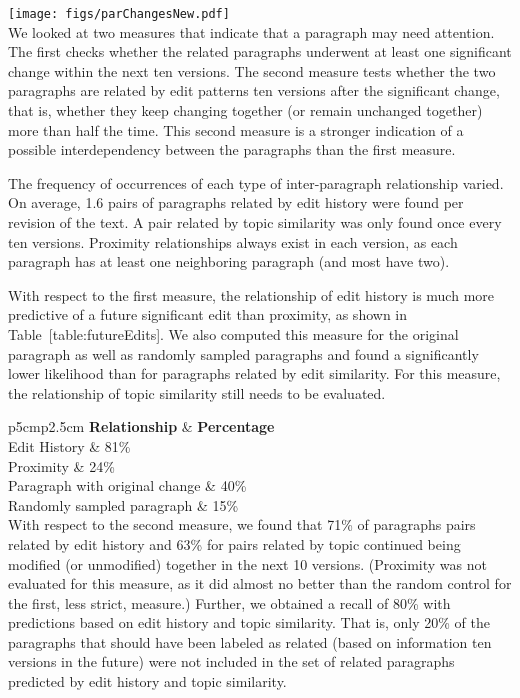 \texttt{[image: figs/parChangesNew.pdf]}\\

We looked at two measures that indicate that a paragraph may need
attention. The first checks whether the related paragraphs underwent at
least one significant change within the next ten versions. The second
measure tests whether the two paragraphs are related by edit patterns
ten versions after the significant change, that is, whether they keep
changing together (or remain unchanged together) more than half the
time. This second measure is a stronger indication of a possible
interdependency between the paragraphs than the first measure.

The frequency of occurrences of each type of inter-paragraph
relationship varied. On average, 1.6 pairs of paragraphs related by edit
history were found per revision of the text. A pair related by topic
similarity was only found once every ten versions. Proximity
relationships always exist in each version, as each paragraph has at
least one neighboring paragraph (and most have two).

With respect to the first measure, the relationship of edit history is
much more predictive of a future significant edit than proximity, as
shown in Table~{[}table:futureEdits{]}. We also computed this measure
for the original paragraph as well as randomly sampled paragraphs and
found a significantly lower likelihood than for paragraphs related by
edit similarity. For this measure, the relationship of topic similarity
still needs to be evaluated.

{\textbar{}p{5cm}\textbar{}p{2.5cm}\textbar{}} \textbf{Relationship} \&
\textbf{Percentage}\\Edit History \& 81\%\\

Proximity \& 24\%\\

Paragraph with original change \& 40\%\\

Randomly sampled paragraph \& 15\%\\

With respect to the second measure, we found that 71\% of paragraphs
pairs related by edit history and 63\% for pairs related by topic
continued being modified (or unmodified) together in the next 10
versions. (Proximity was not evaluated for this measure, as it did
almost no better than the random control for the first, less strict,
measure.) Further, we obtained a recall of 80\% with predictions based
on edit history and topic similarity. That is, only 20\% of the
paragraphs that should have been labeled as related (based on
information ten versions in the future) were not included in the set of
related paragraphs predicted by edit history and topic similarity.


